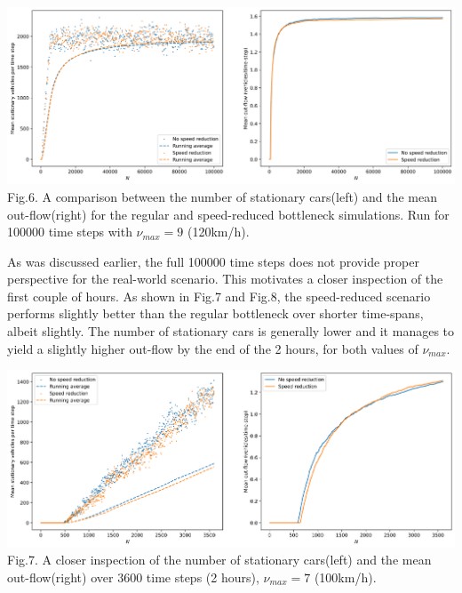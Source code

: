 \documentclass[11pt]{article}
\begin{document}
	\begin{center}
		\includegraphics[scale=0.46]{Figures/Speedlimit_bottleneck_vmax7.png}\\
		Fig.6.	
		A comparison between the number of stationary cars(left) and the mean out-flow(right) for the regular and speed-reduced bottleneck simulations. Run for 100000 time steps with $\nu_{max}=9$ (120km/h). \\
	\end{center}

	As was discussed earlier, the full 100000 time steps does not provide proper perspective for the real-world scenario. This motivates a closer inspection of the first couple of hours. As shown in Fig.7 and Fig.8, the speed-reduced scenario performs slightly better than the regular bottleneck over shorter time-spans, albeit slightly. The number of stationary cars is generally lower and it manages to yield a slightly higher out-flow by the end of the 2 hours, for both values of $\nu_{max}$. \\
	
	\begin{center}
		\includegraphics[scale=0.46]{Figures/Speedlimit_bottleneck_vmax7_zoomed.png}\\
		Fig.7.	
		A closer inspection of the number of stationary cars(left) and the mean out-flow(right) over 3600 time steps (2 hours), $\nu_{max}=7$ (100km/h). \\
	\end{center}
	
\end{document}
